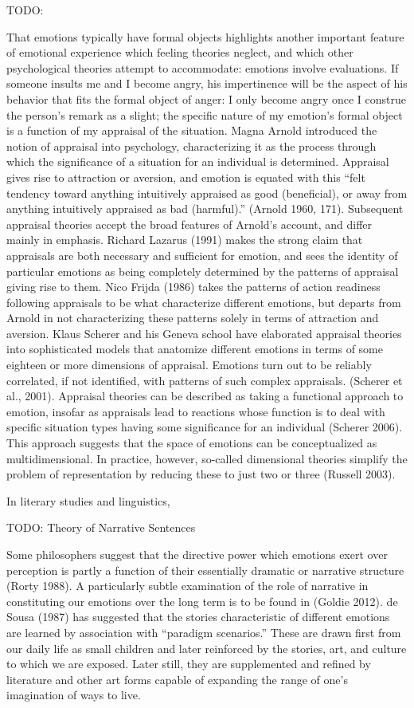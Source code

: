 TODO:

That emotions typically have formal objects highlights another
important feature of emotional experience which feeling theories
neglect, and which other psychological theories attempt to
accommodate: emotions involve evaluations. If someone insults me and I
become angry, his impertinence will be the aspect of his behavior that
fits the formal object of anger: I only become angry once I construe
the person's remark as a slight; the specific nature of my emotion's
formal object is a function of my appraisal of the situation. Magna
Arnold introduced the notion of appraisal into psychology,
characterizing it as the process through which the significance of a
situation for an individual is determined. Appraisal gives rise to
attraction or aversion, and emotion is equated with this ``felt
tendency toward anything intuitively appraised as good (beneficial),
or away from anything intuitively appraised as bad (harmful).''
(Arnold 1960, 171). Subsequent appraisal theories accept the broad
features of Arnold's account, and differ mainly in emphasis. Richard
Lazarus (1991) makes the strong claim that appraisals are both
necessary and sufficient for emotion, and sees the identity of
particular emotions as being completely determined by the patterns of
appraisal giving rise to them. Nico Frijda (1986) takes the patterns
of action readiness following appraisals to be what characterize
different emotions, but departs from Arnold in not characterizing
these patterns solely in terms of attraction and aversion. Klaus
Scherer and his Geneva school have elaborated appraisal theories into
sophisticated models that anatomize different emotions in terms of
some eighteen or more dimensions of appraisal. Emotions turn out to be
reliably correlated, if not identified, with patterns of such complex
appraisals. (Scherer et al., 2001). Appraisal theories can be
described as taking a functional approach to emotion, insofar as
appraisals lead to reactions whose function is to deal with specific
situation types having some significance for an individual (Scherer
2006). This approach suggests that the space of emotions can be
conceptualized as multidimensional. In practice, however, so-called
dimensional theories simplify the problem of representation by
reducing these to just two or three (Russell 2003).

In literary studies and linguistics,

TODO: Theory of Narrative Sentences

Some philosophers suggest that the directive power which emotions
exert over perception is partly a function of their essentially
dramatic or narrative structure (Rorty 1988). A particularly subtle
examination of the role of narrative in constituting our emotions over
the long term is to be found in (Goldie 2012).  de Sousa (1987) has
suggested that the stories characteristic of different emotions are
learned by association with ``paradigm scenarios.'' These are drawn
first from our daily life as small children and later reinforced by
the stories, art, and culture to which we are exposed. Later still,
they are supplemented and refined by literature and other art forms
capable of expanding the range of one's imagination of ways to live.

